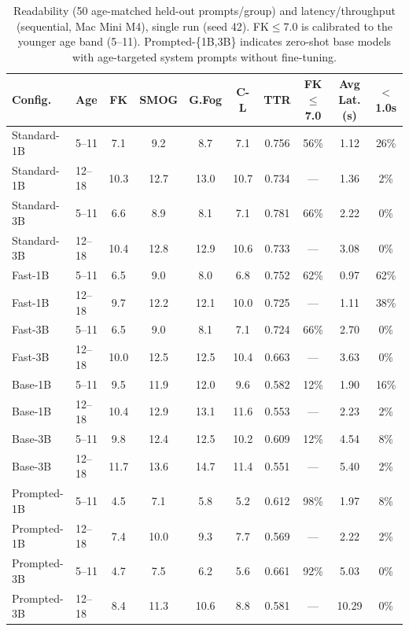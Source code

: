 \documentclass[pdflatex,sn-mathphys-num]{sn-jnl-official}%
\begin{document}
\begin{table}[!h]
  \caption{Readability (50 age-matched held-out prompts/group) and latency/throughput (sequential, Mac Mini M4), single run (seed 42). FK$\leq$7.0 is calibrated to the younger age band (5--11). Prompted-\{1B,3B\} indicates zero-shot base models with age-targeted system prompts without fine-tuning.}
  \label{tab:res2}
  \scriptsize
  \setlength{\tabcolsep}{3pt}
  \begin{tabular}{@{}llcccccccc@{}}
    \toprule
    Config. & Age & FK & SMOG & G.Fog & C-L & TTR & FK$\leq$7.0 & Avg Lat.(s) & $<$1.0s \\
    \midrule
    Standard-1B & 5--11  & 7.1  & 9.2  & 8.7  & 7.1  & 0.756 & 56\% & 1.12 & 26\% \\
    Standard-1B & 12--18 & 10.3 & 12.7 & 13.0 & 10.7 & 0.734 & ---  & 1.36 & 2\%  \\
    Standard-3B & 5--11  & 6.6  & 8.9  & 8.1  & 7.1  & 0.781 & 66\% & 2.22 & 0\%  \\
    Standard-3B & 12--18 & 10.4 & 12.8 & 12.9 & 10.6 & 0.733 & ---  & 3.08 & 0\%  \\
    Fast-1B     & 5--11  & 6.5  & 9.0  & 8.0  & 6.8  & 0.752 & 62\% & 0.97 & 62\% \\
    Fast-1B     & 12--18 & 9.7  & 12.2 & 12.1 & 10.0 & 0.725 & ---  & 1.11 & 38\% \\
    Fast-3B     & 5--11  & 6.5  & 9.0  & 8.1  & 7.1  & 0.724 & 66\% & 2.70 & 0\%  \\
    Fast-3B     & 12--18 & 10.0 & 12.5 & 12.5 & 10.4 & 0.663 & ---  & 3.63 & 0\%  \\
    Base-1B     & 5--11  & 9.5  & 11.9 & 12.0 & 9.6  & 0.582 & 12\% & 1.90 & 16\% \\
    Base-1B     & 12--18 & 10.4 & 12.9 & 13.1 & 11.6 & 0.553 & ---  & 2.23 & 2\%  \\
    Base-3B     & 5--11  & 9.8  & 12.4 & 12.5 & 10.2 & 0.609 & 12\% & 4.54 & 8\%  \\
    Base-3B     & 12--18 & 11.7 & 13.6 & 14.7 & 11.4 & 0.551 & ---  & 5.40 & 2\%  \\
    Prompted-1B & 5--11  & 4.5  & 7.1  & 5.8  & 5.2  & 0.612 & 98\% & 1.97 & 8\%  \\
    Prompted-1B & 12--18 & 7.4  & 10.0 & 9.3  & 7.7  & 0.569 & ---  & 2.22 & 2\%  \\
    Prompted-3B & 5--11  & 4.7  & 7.5  & 6.2  & 5.6  & 0.661 & 92\% & 5.03 & 0\%  \\
    Prompted-3B & 12--18 & 8.4  & 11.3 & 10.6 & 8.8  & 0.581 & ---  & 10.29& 0\%  \\
    \bottomrule
  \end{tabular}
\end{table}
\end{document}
